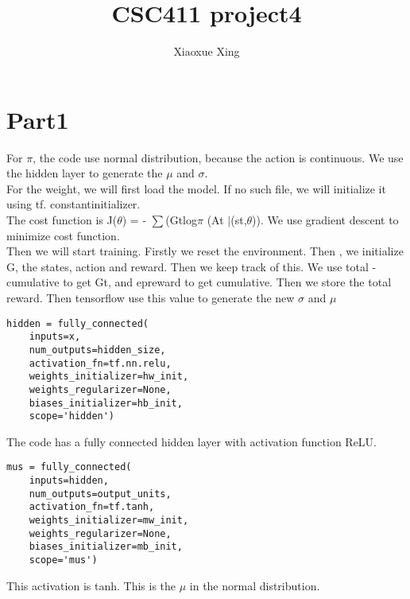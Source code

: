\documentclass{article}
\begin{document}
\title{CSC411 project4}
\author{Xiaoxue Xing\\}
\maketitle
\section{Part1}
For $\pi$, the code  use normal distribution, because the  action is continuous.  We use the hidden  layer to generate the $\mu$ and $\sigma$.\\
For the  weight, we will first load the model. If no such file, we  will initialize it using tf. constantinitializer. \\
The cost function is  J($\theta$) =  - $\sum$(Gtlog$\pi$ (At $\mid$(st,$\theta$)). We use gradient descent to minimize cost function.\\
Then we will start training. Firstly  we  reset the environment. Then , we initialize  G, the  states,  action and reward. Then we keep track of this. We use total - cumulative to get Gt, and epreward to get cumulative. Then we store the  total reward. Then tensorflow use this value to generate the new $\sigma$ and $\mu$ \\
\begin{verbatim}
hidden = fully_connected(
    inputs=x,
    num_outputs=hidden_size,
    activation_fn=tf.nn.relu,
    weights_initializer=hw_init,
    weights_regularizer=None,
    biases_initializer=hb_init,
    scope='hidden')
\end{verbatim}

The code has  a  fully connected hidden layer  with  activation function ReLU.
\begin{verbatim}
mus = fully_connected(
    inputs=hidden,
    num_outputs=output_units,
    activation_fn=tf.tanh,
    weights_initializer=mw_init,
    weights_regularizer=None,
    biases_initializer=mb_init,
    scope='mus')
\end{verbatim}
This activation is  tanh. This is the $\mu$ in the normal distribution.
\end{document}
